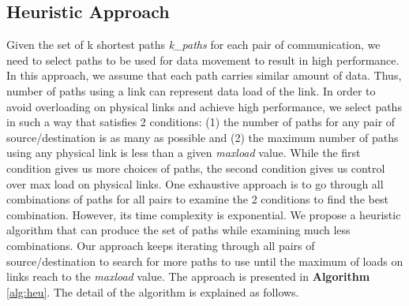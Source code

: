 \subsection{Heuristic Approach}
\label{sec:heuristic}

Given the set of k shortest paths \textit{k\_paths} for each pair of communication, we need to select paths to be used for data movement to result in high performance. In this approach, we assume that each path carries similar amount of data. Thus, number of paths using a link can represent data load of the link. In order to avoid overloading on physical links and achieve high performance, we select paths in such a way that satisfies 2 conditions: (1) the number of paths for any pair of source/destination is as many as possible and (2) the maximum number of paths using any physical link is less than a given \textit{maxload} value. While the first condition gives us more choices of paths, the second condition gives us control over max load on physical links. One exhaustive approach is to go through all combinations of paths for all pairs to examine the 2 conditions to find the best combination. However, its time complexity is exponential. We propose a heuristic algorithm that can produce the set of paths while examining much less combinations. Our approach keeps iterating through all pairs of source/destination to search for more paths to use until the maximum of loads on links reach to the \textit{maxload} value. The approach is presented in \textbf{Algorithm} \ref{alg:heu}. The detail of the algorithm is explained as follows.

